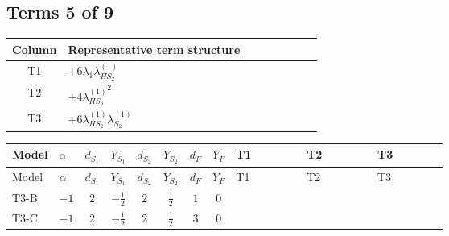 \documentclass[8pt]{article}
\begin{document}
\begin{landscape}
\subsection*{Terms 5 of 9}
\begin{center}
\begin{tabular}{@{}c >{\raggedright\arraybackslash}p{0.82\linewidth}@{}}
\toprule
Column & Representative term structure \\
\midrule
T1 & \(\displaystyle +6 {\lambda_1} {\lambda_{HS_2}^{(1)}}\) \\
\midrule
T2 & \(\displaystyle +4 {\lambda_{HS_2}^{(1)}}^2\) \\
\midrule
T3 & \(\displaystyle +6 {\lambda_{HS_2}^{(1)}} {\lambda_{S_2}^{(1)}}\) \\
\midrule
\bottomrule
\end{tabular}
\end{center}
\smallskip
\tiny
\begin{longtable}{@{}llcccccc >{\raggedright\arraybackslash}p{0.21\linewidth} >{\raggedright\arraybackslash}p{0.21\linewidth} >{\raggedright\arraybackslash}p{0.21\linewidth}@{}}
\toprule
Model & $\alpha$ & $d_{S_1}$ & $Y_{S_1}$ & $d_{S_2}$ & $Y_{S_2}$ & $d_F$ & $Y_F$ & T1 & T2 & T3 \\
\midrule
\endfirsthead
\toprule
Model & $\alpha$ & $d_{S_1}$ & $Y_{S_1}$ & $d_{S_2}$ & $Y_{S_2}$ & $d_F$ & $Y_F$ & T1 & T2 & T3 \\
\midrule
\endhead
T3-B & $-1$ & $2$ & $-\frac{1}{2}$ & $2$ & $\frac{1}{2}$ & $1$ & $0$ & \scriptsize\adjustbox{max width=\linewidth}{$\begin{gathered} +6 {\lambda_1} {\lambda_{HS_2}^{(1)}}\end{gathered}$} & \scriptsize\adjustbox{max width=\linewidth}{$\begin{gathered} +4 {\lambda_{HS_2}^{(1)}}^2\end{gathered}$} & \scriptsize\adjustbox{max width=\linewidth}{$\begin{gathered} +6 {\lambda_{HS_2}^{(1)}} {\lambda_{S_2}^{(1)}}\end{gathered}$} \\
\midrule
T3-C & $-1$ & $2$ & $-\frac{1}{2}$ & $2$ & $\frac{1}{2}$ & $3$ & $0$ & \scriptsize\adjustbox{max width=\linewidth}{$\begin{gathered} +6 {\lambda_1} {\lambda_{HS_2}^{(1)}}\end{gathered}$} & \scriptsize\adjustbox{max width=\linewidth}{$\begin{gathered} +4 {\lambda_{HS_2}^{(1)}}^2\end{gathered}$} & \scriptsize\adjustbox{max width=\linewidth}{$\begin{gathered} +6 {\lambda_{HS_2}^{(1)}} {\lambda_{S_2}^{(1)}}\end{gathered}$} \\

\end{longtable}
\end{landscape}
\end{document}
